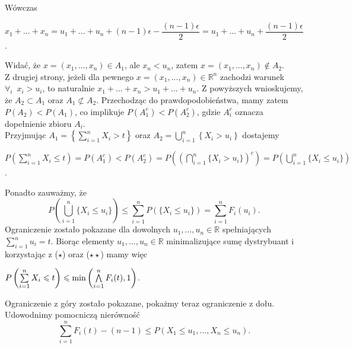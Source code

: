\documentclass[12pt,a4paper,openany]{book}
\begin{document}
\noindent Wówczas
\begin{center}
$x_{1} + ... + x_{n} =  u_{1} + ... + u_{n} + (n-1)\epsilon - \dfrac{(n-1)\epsilon}{2} = u_{1} + ... + u_{n} + \dfrac{(n-1)\epsilon}{2}$.
\end{center}
\noindent Widać,  że $x = (x_{1},...,x_{n}) \in A_{1}$, ale $x_{n} < u_{n}$, zatem  $x = (x_{1},...,x_{n}) \notin A_{2}$.\\
Z drugiej strony, jeżeli dla pewnego $x = (x_{1},...,x_{n}) \in \mathbb{R}^n$ zachodzi warunek $\forall_{i} \phantom{1} x_{i} > u_{i}$, to naturalnie $x_{1} + ... + x_{n} > u_{1} + ... + u_{n}$. Z powyższych wnioskujemy, że $A_{2} \subset A_{1}$ oraz $A_{1} \not\subset A_{2}$. Przechodząc do prawdopodobieństwa, mamy zatem $P(A_{2}) < P(A_{1})$, co implikuje $P(A_{1}^{c}) < P(A_{2}^{c})$, gdzie $A_{i}^{c}$ oznacza dopełnienie zbioru $A_{i}$.  \\
\noindent Przyjmując $A_{1} = \left\lbrace \sum\limits_{i=1}^{n} X_{i} > t \right\rbrace$ oraz $A_{2} = \bigcup\limits_{i=1}^{n} \left\lbrace X_{i} > u_{i} \right\rbrace $ dostajemy
\begin{center}
$P\left(\sum\limits_{i=1}^{n} X_{i} \leqslant t\right) = P(A_{1}^{c}) < P(A_{2}^{c}) =  P\left( \left( \bigcap\limits_{i=1}^{n} \lbrace X_{i} > u_{i} \rbrace \right)^{c} \right) = P\left( \bigcup\limits_{i=1}^{n} \lbrace X_{i} \leqslant u_{i} \rbrace \right)$.
\end{center}
\noindent Ponadto zauważmy, że
\begin{equation}
P\left( \bigcup\limits_{i=1}^{n} \lbrace X_{i} \leqslant u_{i} \rbrace \right) \leqslant \sum\limits_{i=1}^{n} P\left( \lbrace X_{i} \leqslant u_{i} \rbrace \right) = \sum\limits_{i=1}^{n} F_{i}(u_{i}). \tag{$\star$ $\star$}
\end{equation}
\noindent Ograniczenie zostało pokazane dla dowolnych $u_{1},...,u_{n} \in \mathbb{R}$ spełniających $\sum\limits_{i=1}^{n} u_{i} = t$. Biorąc elementy $u_{1},...,u_{n} \in \mathbb{R}$ minimalizujące sumę dystrybuant i korzystając z ($\star$) oraz ($\star \star$) mamy więc
\begin{center}
$P\left(\sum\limits_{i=1}^{n} X_{i} \leqslant t\right) \leqslant \textnormal{min}\left(\bigwedge\limits_{i=1}^{n} F_{i}(t), 1\right)$.
\end{center}
\noindent Ograniczenie z góry zostało pokazane, pokażmy teraz ograniczenie z dołu.\\ Udowodnimy pomocniczą nierówność
\begin{equation}
\sum\limits_{i=1}^{n} F_{i}(t) - (n-1) \leqslant P\left( X_{1} \leqslant u_{1},..., X_{n}  \leqslant u_{n} \right). \tag{$\star$'}
\end{equation}
\end{document}
